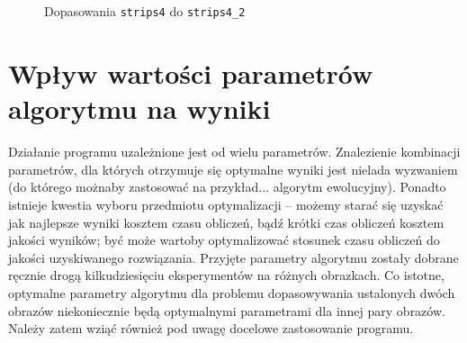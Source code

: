 \documentclass[a4paper,12pt,leqno]{article}
\begin{document}
\begin{figure}\centering
{}\hspace{5mm}
\\
\\
\caption{Dopasowania \texttt{strips4} do \texttt{strips4\_2}}
\end{figure}

\section{Wpływ wartości parametrów algorytmu na wyniki}

Działanie programu uzależnione jest od wielu parametrów. Znalezienie kombinacji parametrów, dla których otrzymuje się optymalne wyniki jest nielada
wyzwaniem (do którego możnaby zastosować na przykład... algorytm ewolucyjny). Ponadto istnieje kwestia wyboru przedmiotu optymalizacji -- możemy starać
się uzyskać jak najlepsze wyniki kosztem czasu obliczeń, bądź krótki czas obliczeń kosztem jakości wyników; być może wartoby optymalizować stosunek
czasu obliczeń do jakości uzyskiwanego rozwiązania. Przyjęte parametry algorytmu zostały dobrane ręcznie drogą kilkudziesięciu eksperymentów na
różnych obrazkach. Co istotne, optymalne parametry algorytmu dla problemu dopasowywania ustalonych dwóch obrazów niekoniecznie będą optymalnymi
parametrami dla innej pary obrazów. Należy zatem wziąć również pod uwagę docelowe zastosowanie programu. 
\end{document}
